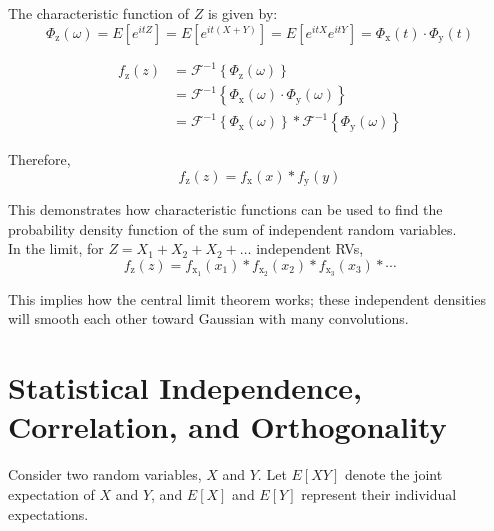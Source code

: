 \documentclass[12pt]{book}
\theoremstyle{definition}
\begin{document}
The characteristic function of \(Z\) is given by:
\[
\Phi_\mathrm{z}(\omega) = E[e^{itZ}] = E[e^{it(X+Y)}] = E[e^{itX}e^{itY}] = \Phi_\mathrm{x}(t) \cdot \Phi_\mathrm{y}(t)
\]


\[
\begin{split}
f_\mathrm{z}(z)  & = \mathcal{F}^{-1} \left \{ \Phi_\mathrm{z}(\omega) \right \}  \\
        & = \mathcal{F}^{-1} \left \{ \Phi_\mathrm{x}(\omega) \cdot \Phi_\mathrm{y}(\omega) \right \} \\
        & = \mathcal{F}^{-1} \left \{ \Phi_\mathrm{x}(\omega) \right \} * \mathcal{F}^{-1} \left \{ \Phi_\mathrm{y}(\omega) \right \}
\end{split}
\]

Therefore,
\[
f_\mathrm{z}(z) = f_\mathrm{x}(x) * f_\mathrm{y}(y)
\]

This demonstrates how characteristic functions can be used to find the probability density function of the sum of independent random variables.\\

In the limit, for \(Z = X_1 + X_2 + X_2 + \ldots\) independent RVs,
\[
f_\mathrm{z}(z) = f_\mathrm{x_1}(x_1) * f_\mathrm{x_2}(x_2) * f_\mathrm{x_3}(x_3) *\cdots
\]

This implies how the central limit theorem works; these independent densities will smooth each other toward Gaussian with many convolutions.    

\section{Statistical Independence, Correlation, and Orthogonality}

Consider two random variables, $X$ and $Y$. Let $E[XY]$ denote the joint expectation of $X$ and $Y$, and $E[X]$ and $E[Y]$ represent their individual expectations.
\end{document}
